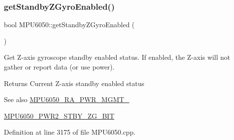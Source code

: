 \begin{DoxyCode}{0}

\end{DoxyCode}
\mbox{\label{classMPU6050_a20f7804db1a980a3c425ae44c33d420b}} 
\subsubsection{\texorpdfstring{getStandbyZGyroEnabled()}{getStandbyZGyroEnabled()}}
{\footnotesize\ttfamily bool M\+P\+U6050\+::get\+Standby\+Z\+Gyro\+Enabled (\begin{DoxyParamCaption}{ }\end{DoxyParamCaption})}

Get Z-\/axis gyroscope standby enabled status. If enabled, the Z-\/axis will not gather or report data (or use power). \begin{DoxyReturn}{Returns}
Current Z-\/axis standby enabled status 
\end{DoxyReturn}
\begin{DoxySeeAlso}{See also}
\mbox{\hyperlink{MPU6050_8h_aace6ce286da4d5f8c8f5ba6f80688e13}{M\+P\+U6050\+\_\+\+R\+A\+\_\+\+P\+W\+R\+\_\+\+M\+G\+M\+T\+\_}} 

\mbox{\hyperlink{MPU6050_8h_a6da4d8df0e058732364f3353c30527c5}{M\+P\+U6050\+\_\+\+P\+W\+R2\+\_\+\+S\+T\+B\+Y\+\_\+\+Z\+G\+\_\+\+B\+IT}} 
\end{DoxySeeAlso}


Definition at line 3175 of file M\+P\+U6050.\+cpp.


